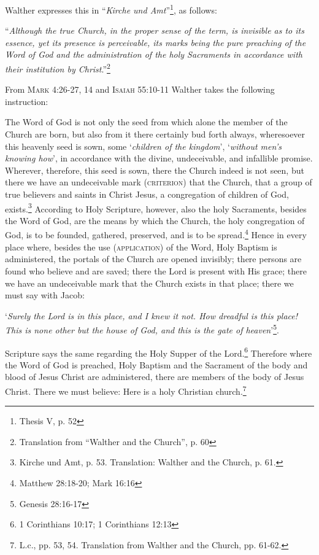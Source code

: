 Walther expresses this in “\textit{Kirche und Amt}”\footnote{Thesis V, p. 52}, as follows: \begin{displayquote} “\textit{Although the true Church, in the proper sense of the term, is invisible as to its essence, yet its presence is perceivable, its marks being the pure preaching of the Word of God and the administration of the holy Sacraments in accordance with their institution by Christ}.”\footnote{Translation from “Walther and the Church”, p. 60}\end{displayquote}  From {\small \textsc{Mark 4:26-27, 14}} and {\small \textsc{Isaiah 55:10-11}} Walther takes the following instruction: \begin{fancyquotes}The Word of God is not only the seed from which alone the member of the Church are born, but also from it there certainly bud forth always, wheresoever this heavenly seed is sown, some ‘\textit{children of the kingdom}’, ‘\textit{without men’s knowing how}’, in accordance with the divine, undeceivable, and infallible promise.  Wherever, therefore, this seed is sown, there the Church indeed is not seen, but there we have an undeceivable mark {\scriptsize\textsc{(criterion)}} that the Church, that a group of true believers and saints in Christ Jesus, a congregation of children of God, exists.\footnote{Kirche und Amt, p. 53.  Translation: Walther and the Church, p. 61.}
\divider
 According to Holy Scripture, however, also the holy Sacraments, besides the Word of God, are the means by which the Church, the holy congregation of God, is to be founded, gathered, preserved, and is to be spread.\footnote{Matthew 28:18-20; Mark 16:16} Hence in every place where, besides the use {\scriptsize\textsc{(application)}} of the Word, Holy Baptism is administered, the portals of the Church are opened invisibly; there persons are found who believe and are saved; there the Lord is present with His grace; there we have an undeceivable mark that the Church exists in that place; there we must say with Jacob: \begin{displayquote}‘\textit{Surely the Lord is in this place, and I knew it not.  How dreadful is this place!  This is none other but the house of God, and this is the gate of heaven}’\footnote{Genesis 28:16-17}.\end{displayquote} Scripture says the same regarding the Holy Supper of the Lord.\footnote{1 Corinthians 10:17; 1 Corinthians 12:13}  Therefore where the Word of God is preached, Holy Baptism and the Sacrament of the body and blood of Jesus Christ are administered, there are members of the body of Jesus Christ.  There we must believe: Here is a holy Christian church.\footnote{L.c., pp. 53, 54.  Translation from Walther and the Church, pp. 61-62.}\end{fancyquotes}

